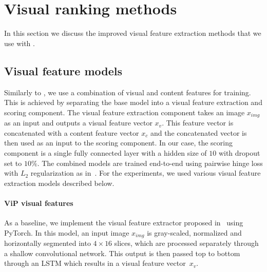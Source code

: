 
\section{Visual ranking methods}
In this section we discuss the improved visual feature extraction methods that we use with \datasetname.

\subsection{Visual feature models}
Similarly to \cite{fan2017learning}, we use a combination of visual and content features for training.
This is achieved by separating the base model into a visual feature extraction and scoring component.
The visual feature extraction component takes an image $x_{img}$ as an input and outputs a visual feature vector $x_{v}$.
This feature vector is concatenated with a content feature vector $x_{c}$ and the concatenated vector is then used as an input to the scoring component.
In our case, the scoring component is a single fully connected layer with a hidden size of $10$ with dropout set to $10\%$.
The combined models  are trained end-to-end using pairwise hinge loss with $L_2$ regularization as in~\cite{fan2017learning}.
For the experiments, we used various visual feature extraction models described below.

\paragraph{ViP visual features}
As a baseline, we implement the visual feature extractor proposed in~\citet{fan2017learning} using PyTorch.
In this model, an input image $x_{img}$ is gray-scaled, normalized and horizontally segmented into $4\times16$ slices, which are processed separately through a shallow convolutional network.
This output is then passed top to bottom through an LSTM which results in a visual feature vector~$x_{v}$. 

